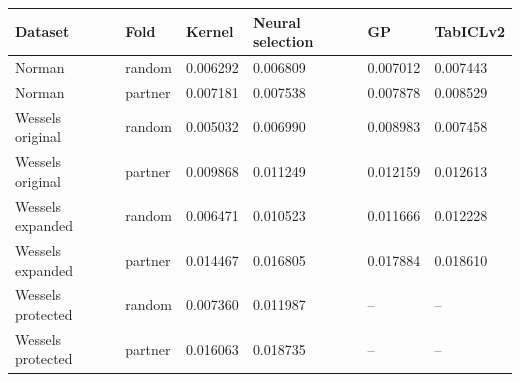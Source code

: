 \begin{tabular}{llllll}
\toprule
Dataset & Fold & Kernel & Neural selection & GP & TabICLv2 \\
\midrule
Norman & random & 0.006292 & 0.006809 & 0.007012 & 0.007443 \\
Norman & partner & 0.007181 & 0.007538 & 0.007878 & 0.008529 \\
Wessels original & random & 0.005032 & 0.006990 & 0.008983 & 0.007458 \\
Wessels original & partner & 0.009868 & 0.011249 & 0.012159 & 0.012613 \\
Wessels expanded & random & 0.006471 & 0.010523 & 0.011666 & 0.012228 \\
Wessels expanded & partner & 0.014467 & 0.016805 & 0.017884 & 0.018610 \\
Wessels protected & random & 0.007360 & 0.011987 & -- & -- \\
Wessels protected & partner & 0.016063 & 0.018735 & -- & -- \\
\bottomrule
\end{tabular}
